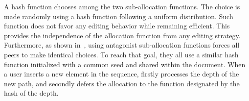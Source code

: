 \begin{asparadesc}
\item [A hash function] chooses among the two sub-allocation functions. The
  choice is made randomly using a hash function following a uniform
  distribution. Such function does not favor any editing behavior while
  remaining efficient. This provides the independence of the allocation function
  from any editing strategy. Furthermore, as shown
  in~\cite{nedelec2013concurrency}, using antagonist sub-allocation functions
  forces all peers to make identical choices. To reach that goal, they all use a
  similar hash function initialized with a common seed and shared within the
  document. When a user inserts a new element in the sequence, \LSEQ firstly
  processes the depth of the new path, and secondly defers the allocation to the
  function designated by the hash of the depth.
\end{asparadesc}

%   
  

%   


